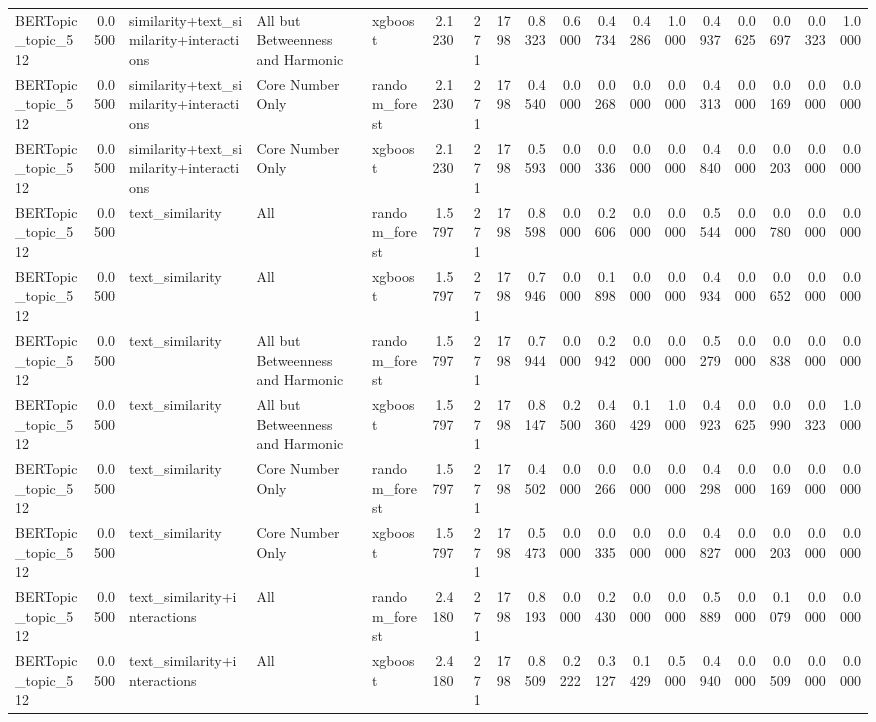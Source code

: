 \begin{tabular}{lrlllrrrrrrrrrrrrr}
BERTopic_topic_512 & 0.0500 & similarity+text_similarity+interactions & All but Betweenness and Harmonic & xgboost & 2.1230 & 271 & 1798 & 0.8323 & 0.6000 & 0.4734 & 0.4286 & 1.0000 & 0.4937 & 0.0625 & 0.0697 & 0.0323 & 1.0000 \\
BERTopic_topic_512 & 0.0500 & similarity+text_similarity+interactions & Core Number Only & random_forest & 2.1230 & 271 & 1798 & 0.4540 & 0.0000 & 0.0268 & 0.0000 & 0.0000 & 0.4313 & 0.0000 & 0.0169 & 0.0000 & 0.0000 \\
BERTopic_topic_512 & 0.0500 & similarity+text_similarity+interactions & Core Number Only & xgboost & 2.1230 & 271 & 1798 & 0.5593 & 0.0000 & 0.0336 & 0.0000 & 0.0000 & 0.4840 & 0.0000 & 0.0203 & 0.0000 & 0.0000 \\
BERTopic_topic_512 & 0.0500 & text_similarity & All & random_forest & 1.5797 & 271 & 1798 & 0.8598 & 0.0000 & 0.2606 & 0.0000 & 0.0000 & 0.5544 & 0.0000 & 0.0780 & 0.0000 & 0.0000 \\
BERTopic_topic_512 & 0.0500 & text_similarity & All & xgboost & 1.5797 & 271 & 1798 & 0.7946 & 0.0000 & 0.1898 & 0.0000 & 0.0000 & 0.4934 & 0.0000 & 0.0652 & 0.0000 & 0.0000 \\
BERTopic_topic_512 & 0.0500 & text_similarity & All but Betweenness and Harmonic & random_forest & 1.5797 & 271 & 1798 & 0.7944 & 0.0000 & 0.2942 & 0.0000 & 0.0000 & 0.5279 & 0.0000 & 0.0838 & 0.0000 & 0.0000 \\
BERTopic_topic_512 & 0.0500 & text_similarity & All but Betweenness and Harmonic & xgboost & 1.5797 & 271 & 1798 & 0.8147 & 0.2500 & 0.4360 & 0.1429 & 1.0000 & 0.4923 & 0.0625 & 0.0990 & 0.0323 & 1.0000 \\
BERTopic_topic_512 & 0.0500 & text_similarity & Core Number Only & random_forest & 1.5797 & 271 & 1798 & 0.4502 & 0.0000 & 0.0266 & 0.0000 & 0.0000 & 0.4298 & 0.0000 & 0.0169 & 0.0000 & 0.0000 \\
BERTopic_topic_512 & 0.0500 & text_similarity & Core Number Only & xgboost & 1.5797 & 271 & 1798 & 0.5473 & 0.0000 & 0.0335 & 0.0000 & 0.0000 & 0.4827 & 0.0000 & 0.0203 & 0.0000 & 0.0000 \\
BERTopic_topic_512 & 0.0500 & text_similarity+interactions & All & random_forest & 2.4180 & 271 & 1798 & 0.8193 & 0.0000 & 0.2430 & 0.0000 & 0.0000 & 0.5889 & 0.0000 & 0.1079 & 0.0000 & 0.0000 \\
BERTopic_topic_512 & 0.0500 & text_similarity+interactions & All & xgboost & 2.4180 & 271 & 1798 & 0.8509 & 0.2222 & 0.3127 & 0.1429 & 0.5000 & 0.4940 & 0.0000 & 0.0509 & 0.0000 & 0.0000 \\

\end{tabular}
